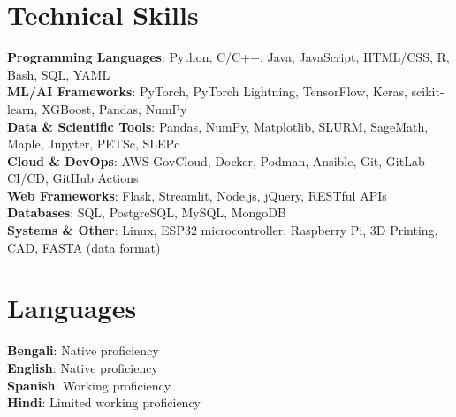 \documentclass[letterpaper,11pt]{article}
\begin{document}
\section{Technical Skills}
 \begin{itemize}[leftmargin=0.15in, label={}]
    \small{\item{
     \textbf{Programming Languages}{: Python, C/C++, Java, JavaScript, HTML/CSS, R, Bash, SQL, YAML} \\
     \textbf{ML/AI Frameworks}{: PyTorch, PyTorch Lightning, TensorFlow, Keras, scikit-learn, XGBoost, Pandas, NumPy} \\
     \textbf{Data \& Scientific Tools}{: Pandas, NumPy, Matplotlib, SLURM, SageMath, Maple, Jupyter, PETSc, SLEPc} \\
     \textbf{Cloud \& DevOps}{: AWS GovCloud, Docker, Podman, Ansible, Git, GitLab CI/CD, GitHub Actions} \\
     \textbf{Web Frameworks}{: Flask, Streamlit, Node.js, jQuery, RESTful APIs} \\
     \textbf{Databases}{: SQL, PostgreSQL, MySQL, MongoDB} \\
     \textbf{Systems \& Other}{: Linux, ESP32 microcontroller, Raspberry Pi, 3D Printing, CAD, FASTA (data format)}
    }}
 \end{itemize}

\section{Languages}
  \begin{itemize}[leftmargin=0.15in, label={}]
    \small{\item{
      \textbf{Bengali}{: Native proficiency} \\
      \textbf{English}{: Native proficiency} \\
      \textbf{Spanish}{: Working proficiency} \\
      \textbf{Hindi}{: Limited working proficiency}
    }}
  \end{itemize}

\end{document}
